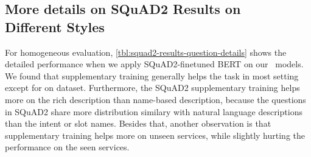\subsection[More details on SQuAD2 Results on Different Styles]{More details on SQuAD2 Results on \\Different Styles}
\label{ssec:sgd:squad2_homo}
For homogeneous evaluation,
\autoref{tbl:squad2-results-question-details} shows the detailed
performance when we apply SQuAD2-finetuned BERT on our \NSL~models.
We found that supplementary training generally helps the \NSL task in
most setting except for \NAMEONLY on \sgdst dataset. Furthermore, the
SQuAD2 supplementary training helps more on the rich description than
name-based description, because the questions in SQuAD2 share more
distribution similary with natural language descriptions than the
intent or slot names. Besides that, another observation is that
supplementary training helps more on unseen services, while slightly
hurting the performance on the seen services.

